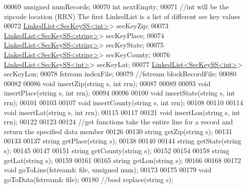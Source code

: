 \begin{DoxyCode}
00069     \textcolor{keywordtype}{unsigned} numRecords;
00070     \textcolor{keywordtype}{int} nextEmpty;
00071     \textcolor{comment}{//int will be the zipcode location (RRN) The first LinkedList is a list of different sec key values}
00072     \hyperlink{classLinkedList}{LinkedList<SecKeySS<int>}> secKeyZip;
00073     \hyperlink{classLinkedList}{LinkedList<SecKeySS<string>}> secKeyPlace;
00074     \hyperlink{classLinkedList}{LinkedList<SecKeySS<string>}> secKeyState;
00075     \hyperlink{classLinkedList}{LinkedList<SecKeySS<string>}> secKeyCounty;
00076     \hyperlink{classLinkedList}{LinkedList<SecKeySS<int>}> secKeyLat;
00077     \hyperlink{classLinkedList}{LinkedList<SecKeySS<int>}> secKeyLon;
00078     fstream indexFile;
00079     \textcolor{comment}{//fstream blockRecordFile;}
00080     
00082 
00086     \textcolor{keywordtype}{void} insertZip(\textcolor{keywordtype}{string} s, \textcolor{keywordtype}{int} rrn);
00087     
00089 
00093     \textcolor{keywordtype}{void} insertPlace(\textcolor{keywordtype}{string} s, \textcolor{keywordtype}{int} rrn);
00094     
00096 
00100     \textcolor{keywordtype}{void} insertState(\textcolor{keywordtype}{string} s, \textcolor{keywordtype}{int} rrn);
00101     
00103 
00107     \textcolor{keywordtype}{void} insertCounty(\textcolor{keywordtype}{string} s, \textcolor{keywordtype}{int} rrn);
00108     
00110 
00114     \textcolor{keywordtype}{void} insertLat(\textcolor{keywordtype}{string} s, \textcolor{keywordtype}{int} rrn);
00115     
00117 
00121     \textcolor{keywordtype}{void} insertLon(\textcolor{keywordtype}{string} s, \textcolor{keywordtype}{int} rrn);
00122     
00123 
00124     \textcolor{comment}{//get functions take the entire line for a record and return the specified data member}
00126 \textcolor{comment}{}
00130     \textcolor{keywordtype}{string} getZip(\textcolor{keywordtype}{string} s);    
00131 
00133 
00137     \textcolor{keywordtype}{string} getPlace(\textcolor{keywordtype}{string} s);
00138 
00140 
00144     \textcolor{keywordtype}{string} getState(\textcolor{keywordtype}{string} s);
00145 
00147 
00151     \textcolor{keywordtype}{string} getCounty(\textcolor{keywordtype}{string} s);
00152 
00154 
00158     \textcolor{keywordtype}{string} getLat(\textcolor{keywordtype}{string} s);
00159 
00161 
00165     \textcolor{keywordtype}{string} getLon(\textcolor{keywordtype}{string} s);
00166     
00168 
00172     \textcolor{keywordtype}{void} goToLine(fstream& file, \textcolor{keywordtype}{unsigned} num);
00173 
00175 
00179     \textcolor{keywordtype}{void} goToData(fstream& file);
00180     \textcolor{comment}{//bool replace(string s);}

\end{DoxyCode}
